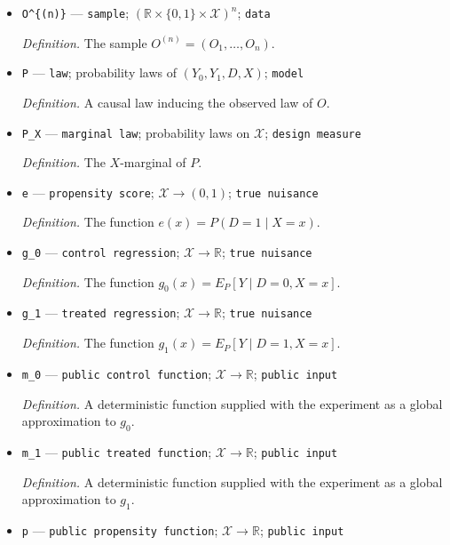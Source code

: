 \documentclass{article}
\begin{document}
\begin{itemize}
  \par\smallskip\noindent\emph{Definition.} The vector \(O=(Y,D,X)\).
  \item \texttt{O\textasciicircum{}\{(n)\}\allowbreak{}} --- \texttt{sample}; \((\mathbb R\times\{0,1\}\times\mathcal X)^n\); \texttt{data}
  \par\smallskip\noindent\emph{Definition.} The sample \(O^{(n)}=(O_1,\ldots,O_n)\).
  \item \texttt{P} --- \texttt{law}; probability laws of \((Y_0,Y_1,D,X)\); \texttt{model}
  \par\smallskip\noindent\emph{Definition.} A causal law inducing the observed law of \(O\).
  \item \texttt{P\_\allowbreak{}X} --- \texttt{marginal law}; probability laws on \(\mathcal X\); \texttt{design measure}
  \par\smallskip\noindent\emph{Definition.} The \(X\)-marginal of \(P\).
  \item \texttt{e} --- \texttt{propensity score}; \(\mathcal X\to(0,1)\); \texttt{true nuisance}
  \par\smallskip\noindent\emph{Definition.} The function \(e(x)=P(D=1\mid X=x)\).
  \item \texttt{g\_\allowbreak{}0} --- \texttt{control regression}; \(\mathcal X\to\mathbb R\); \texttt{true nuisance}
  \par\smallskip\noindent\emph{Definition.} The function \(g_0(x)=E_P[Y\mid D=0,X=x]\).
  \item \texttt{g\_\allowbreak{}1} --- \texttt{treated regression}; \(\mathcal X\to\mathbb R\); \texttt{true nuisance}
  \par\smallskip\noindent\emph{Definition.} The function \(g_1(x)=E_P[Y\mid D=1,X=x]\).
  \item \texttt{m\_\allowbreak{}0} --- \texttt{public control function}; \(\mathcal X\to\mathbb R\); \texttt{public input}
  \par\smallskip\noindent\emph{Definition.} A deterministic function supplied with the experiment as a global approximation to \(g_0\).
  \item \texttt{m\_\allowbreak{}1} --- \texttt{public treated function}; \(\mathcal X\to\mathbb R\); \texttt{public input}
  \par\smallskip\noindent\emph{Definition.} A deterministic function supplied with the experiment as a global approximation to \(g_1\).
  \item \texttt{p} --- \texttt{public propensity function}; \(\mathcal X\to\mathbb R\); \texttt{public input}

\end{itemize}
\end{document}
